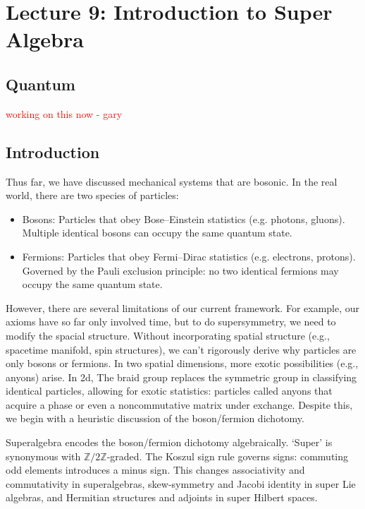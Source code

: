 \newpage 

\section{Lecture 9: Introduction to Super Algebra}

\subsection{Quantum}

\textcolor{red}{working on this now - gary}
\subsection{Introduction}
Thus far, we have discussed mechanical systems that are bosonic. In the real world, there are two species of particles:
    \begin{itemize}
        \item Bosons: Particles that obey Bose–Einstein statistics (e.g. photons, gluons). Multiple identical bosons can occupy the same quantum state.
        \item Fermions: Particles that obey Fermi–Dirac statistics (e.g. electrons, protons). Governed by the Pauli exclusion principle: no two identical fermions may occupy the same quantum state.
    \end{itemize}

However, there are several limitations of our current framework. For example, our axioms have so far only involved time, but to do supersymmetry, we need to modify the spacial structure. Without incorporating spatial structure (e.g., spacetime manifold, spin structures), we can't rigorously derive why particles are only bosons or fermions. In two spatial dimensions, more exotic possibilities (e.g., anyons) arise. In 2d, The braid group replaces the symmetric group in classifying identical particles, allowing for exotic statistics: particles called anyons that acquire a phase or even a noncommutative matrix under exchange. Despite this, we begin with a heuristic discussion of the boson/fermion dichotomy.

 Superalgebra encodes the boson/fermion dichotomy algebraically. ‘Super’ is synonymous with $\mathbb{Z}/2\mathbb{Z}$-graded. The Koszul sign rule governs signs: commuting odd elements introduces a minus sign. This changes associativity and commutativity in superalgebras, skew-symmetry and Jacobi identity in super Lie algebras, and Hermitian structures and adjoints in super Hilbert spaces.

